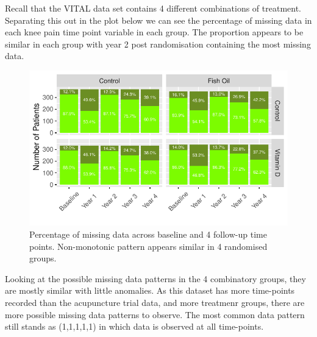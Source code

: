 \documentclass{article}
\newcommand{\pandocbounded}[1]{#1}
\begin{document}
Recall that the VITAL data set contains 4 different combinations of
treatment. Separating this out in the plot below we can see the
percentage of missing data in each knee pain time point variable in each
group. The proportion appears to be similar in each group with year 2
post randomisation containing the most missing data.

\begin{figure}
\centering
\pandocbounded{\includegraphics[keepaspectratio]{Final_Report_files/figure-latex/unnamed-chunk-22-1.pdf}}
\caption{Percentage of missing data across baseline and 4 follow-up time
points. Non-monotonic pattern appears similar in 4 randomised groups.}
\end{figure}

Looking at the possible missing data patterns in the 4 combinatory
groups, they are mostly similar with little anomalies. As this dataset
has more time-points recorded than the acupuncture trial data, and more
treatmenr groups, there are more possible missing data patterns to
observe. The most common data pattern still stands as (1,1,1,1,1) in
which data is observed at all time-points.
\end{document}
